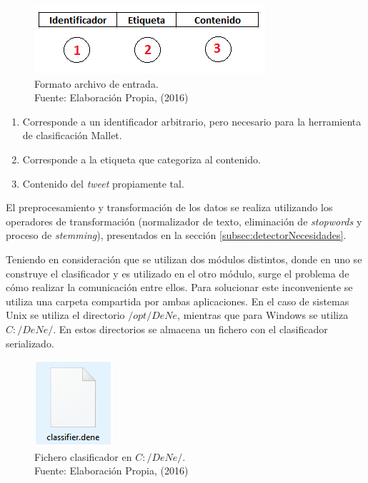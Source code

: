 \begin{figure}[H]
	\centering
	\captionsetup{justification=centering}
	\includegraphics[scale=0.8]{images/FormatoArchivoEntrada.png}
	\caption[Formato archivo de entrada.]{Formato archivo de entrada.\\Fuente: Elaboración Propia, (2016)}
	\label{fig:formatoFig}
\end{figure}

\begin{enumerate}
\item Corresponde a un identificador arbitrario, pero necesario para la herramienta de clasificación Mallet.
\item Corresponde a la etiqueta que categoriza al contenido.
\item Contenido del \textit{tweet} propiamente tal.
\end{enumerate}

El preprocesamiento y transformación de los datos se realiza utilizando los operadores de transformación (normalizador de texto, eliminación de \textit{stopwords} y proceso de \textit{stemming}), presentados en la sección \ref{subsec:detectorNecesidades}.

Teniendo en consideración que se utilizan dos módulos distintos, donde en uno se construye el clasificador y es utilizado en el otro módulo, surge el problema de cómo realizar la comunicación entre ellos. Para solucionar este inconveniente se utiliza una carpeta compartida por ambas aplicaciones. En el caso de sistemas Unix se utiliza el directorio $/opt/DeNe$, mientras que para Windows se utiliza $C:/DeNe/$. En estos directorios se almacena un fichero con el clasificador serializado.

\begin{figure}[H]
	\centering
	\captionsetup{justification=centering}
	\includegraphics[scale=0.8]{images/ClasifierDene.png}
	\caption[Fichero clasificador en $c:/DeNe/$.]{Fichero clasificador en $C:/DeNe/$.\\Fuente: Elaboración Propia, (2016)}
	\label{fig:TopologiaGeneral}
\end{figure}

